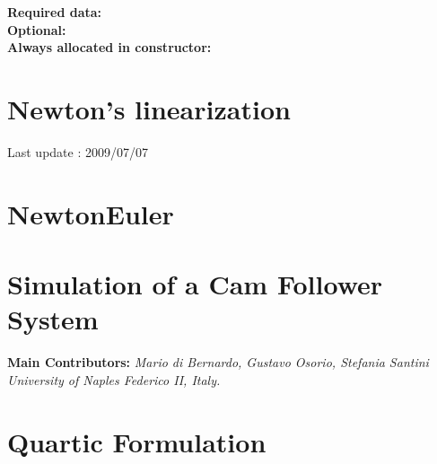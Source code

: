 \documentclass[10pt]{report}
\begin{document}
\bf{Required data:}\\

\bf{Optional:}\\

\bf{Always allocated in constructor:} \\


\chapter{Newton's linearization}
Last update : 2009/07/07




\chapter{NewtonEuler}


%  


\chapter{Simulation of a Cam Follower System}
{\bf Main Contributors:} {\textit{Mario di Bernardo, Gustavo Osorio, Stefania Santini}}\\
\textit{University of Naples Federico II, Italy.}\\


\chapter{Quartic Formulation}

\end{document}
